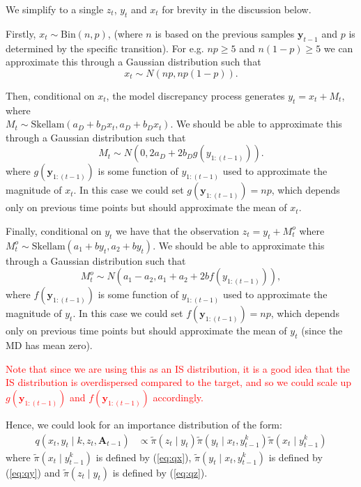 \documentclass[a4paper]{article}
\newcommand{\by}{\bm{y}}
\newcommand{\bA}{\bm{A}}
\begin{document}
We simplify to a single $z_t$, $y_t$ and $x_t$ for brevity in the discussion below.

Firstly, $x_t \sim \mbox{Bin}\left(n, p\right)$, (where $n$ is based on the previous samples $\by_{t - 1}$ and $p$ is determined by the specific transition). For e.g. $np \geq 5$ and $n(1 - p) \geq 5$ we can approximate this through a  Gaussian distribution such that 
\begin{equation}
    x_t \sim N\left(np, np(1 - p)\right).\label{eq:qx}
\end{equation}

Then, conditional on $x_t$, the model discrepancy process generates $y_t = x_t + M_t$, where \\$M_t \sim \mbox{Skellam}\left(a_D + b_D x_t, a_D + b_D x_t\right)$. We should be able to approximate this through a Gaussian distribution such that 
\begin{equation}
    M_t \sim N\left(0, 2a_D + 2b_D g\left(y_{1:(t - 1)}\right)\right).\label{eq:qy}
\end{equation}
where $g\left(\by_{1:(t - 1)}\right)$ is some function of $y_{1:(t - 1)}$ used to approximate the magnitude of $x_t$. In this case we could set $g\left(\by_{1:(t - 1)}\right) = np$, which depends only on previous time points but should approximate the mean of $x_t$.

Finally, conditional on $y_t$ we have that the observation $z_t = y_t + M^o_t$ where $M^o_t \sim \mbox{Skellam}\left(a_1 + b y_t, a_2 + b y_t\right)$. We should be able to approximate this through a Gaussian distribution such that 
\begin{equation}
    M^o_t \sim N\left(a_1 - a_2, a_1 + a_2 + 2b f\left(y_{1:(t - 1)}\right)\right),\label{eq:qz}
\end{equation}
where $f\left(\by_{1:(t - 1)}\right)$ is some function of $y_{1:(t - 1)}$ used to approximate the magnitude of $y_t$. In this case we could set $f\left(\by_{1:(t - 1)}\right) = np$, which depends only on previous time points but should approximate the mean of $y_t$ (since the MD has mean zero).

\textcolor{red}{Note that since we are using this as an IS distribution, it is a good idea that the IS distribution is overdispersed compared to the target, and so we could scale up $g\left(\by_{1:(t - 1)}\right)$ and $f\left(\by_{1:(t - 1)}\right)$ accordingly.}

Hence, we could look for an importance distribution of the form:
\begin{align}
    q\left(x_t, y_t \mid k, z_t, \bA_{t - 1}\right) &\propto \tilde{\pi}\left(z_t \mid y_t\right)\tilde{\pi}\left(y_t \mid x_t, y^k_{t - 1}\right)\tilde{\pi}\left(x_t \mid y^k_{t - 1}\right)
\end{align}
where $\tilde{\pi}\left(x_t \mid y^k_{t - 1}\right)$ is defined by (\ref{eq:qx}), $\tilde{\pi}\left(y_t \mid x_t, y^k_{t - 1}\right)$ is defined by (\ref{eq:qy}) and $\tilde{\pi}\left(z_t \mid y_t\right)$ is defined by (\ref{eq:qz}).
\end{document}
